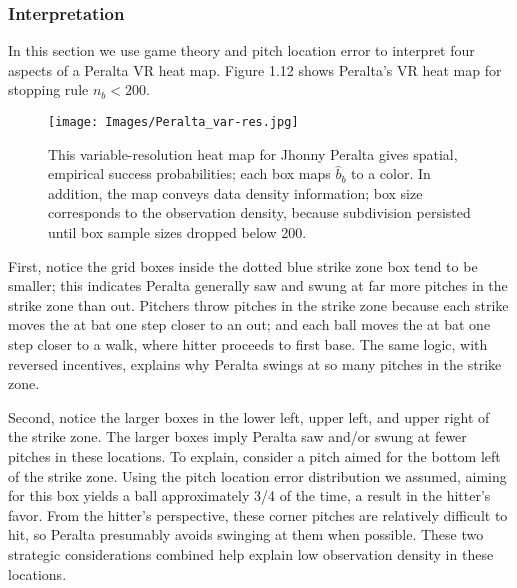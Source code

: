
\subsubsection{Interpretation}
In this section we use game theory and pitch location error to interpret four aspects of a Peralta VR heat map. Figure 1.12 shows Peralta's VR heat map for stopping rule $n_{b} < 200$.
        \begin{figure}[H]
      	\centering      
      	\texttt{[image: Images/Peralta\_var-res.jpg]}
      	\caption{This variable-resolution heat map for Jhonny Peralta gives spatial, empirical success probabilities; each box maps $\hat{b}_{b}$ to a color. In addition, the map conveys data density information; box size corresponds to the observation density, because subdivision persisted until box sample sizes dropped below 200.}
        \end{figure}
First, notice the grid boxes inside the dotted blue strike zone box tend to be smaller; this indicates Peralta generally saw and swung at far more pitches in the strike zone than out. Pitchers throw pitches in the strike zone because each strike moves the at bat one step closer to an out; and each ball moves the at bat one step closer to a walk, where hitter proceeds to first base. The same logic, with reversed incentives, explains why Peralta swings at so many pitches in the strike zone. 

Second, notice the larger boxes in the lower left, upper left, and upper right of the strike zone. The larger boxes imply Peralta saw and/or swung at fewer pitches in these locations. To explain, consider a pitch aimed for the bottom left of the strike zone. Using the pitch location error distribution we assumed, aiming for this box yields a ball approximately 3/4 of the time, a result in the hitter's favor. From the hitter's perspective, these corner pitches are relatively difficult to hit, so Peralta presumably avoids swinging at them when possible. These two strategic considerations combined help explain low observation density in these locations.

